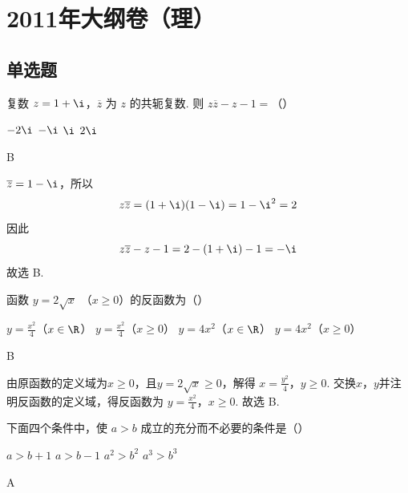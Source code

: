 \chapter{2011年大纲卷（理）}

\section{单选题}

\begin{problem}
复数 \(z = 1 + \i\)，\(\overline{z}\) 为 \(z\) 的共轭复数. 则 \(z\overline{z} - z - 1 =\)（\quad）

\choices
    {\(-2\i\)}
    {\(-\i\)}
    {\(\i\)}
    {\(2\i\)}
\end{problem}

\begin{answer}
B
\end{answer}

\begin{solution}
\(\overline{z}=1-\i\)，所以
\[
z\overline{z}=(1+\i)(1-\i)=1-\i^2=2
\]
因此
\[
z\overline{z}-z-1=2-(1+\i)-1=-\i
\]
故选 B.
\end{solution}


\begin{problem}
函数 \( y = 2\sqrt{x} \) （\(x \geqslant 0\)）的反函数为（\quad）

\choices
    {\( y = \frac{x^2}{4} \)（\(x \in \R\)）}
    {\( y = \frac{x^2}{4} \)（\(x \geqslant 0\)）}
    {\( y = 4x^{2} \)（\(x \in \R\)）}
    {\( y = 4x^{2} \)（\(x \geqslant 0\)）}
\end{problem}

\begin{answer}
B
\end{answer}

\begin{solution}
由原函数的定义域为\(x\geqslant0\)，且\(y=2\sqrt{x}\geqslant0\)，解得
\(x=\frac{y^2}{4}\)，\(y\geqslant0\).
交换\(x\)，\(y\)并注明反函数的定义域，得反函数为
\(y=\frac{x^2}{4}\)，\(x\geqslant0\).
故选 B.
\end{solution}


\begin{problem}
下面四个条件中，使 \(a > b\) 成立的充分而不必要的条件是（\quad）

\choices
    {\(a > b + 1\)}
    {\(a > b - 1\)}
    {\(a^2 > b^2\)}
    {\(a^3 > b^3\)}
\end{problem}

\begin{answer}
A
\end{answer}

